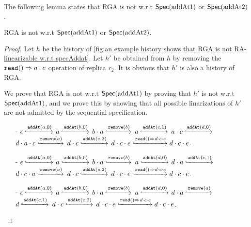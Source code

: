 The following lemma states that RGA is not \crdtlinearizable{} w.r.t $\specAddatOne$ or $\specAddatTwo$.

\begin{lemma}
\label{lemma:The history h of fig an example history shows that RGA is not RA-linarizable w.r.t specAddat is not RA-linearizable w.r.t SpecAddatOne or SpecAddatTwo}
RGA is not \crdtlinearizable{} w.r.t $\specAddatOne$ or $\specAddatTwo$.
\end{lemma}

\begin {proof}
Let $h$ be the history of \autoref{fig:an example history shows that RGA is not RA-linearizable w.r.t specAddat}. Let $h'$ be obtained from $h$ by removing the $\alabellong[\mathtt{read}]{}{a \cdot c}{}$ operation of replica $r_2$. It is obvious that $h'$ is also a history of RGA.

We prove that RGA is not \crdtlinearizable{} w.r.t $\specAddatOne$ by proving that $h'$ is not \crdtlinearizable{} w.r.t $\specAddatOne$, and we prove this by showing that all possible linarizations of $h'$ are not admitted by the sequential specification.

\begin{itemize}
\setlength{\itemsep}{0.5pt}
\item[-] $\epsilon \specarrow{\alabelshort[\mathtt{addAt}]{a,0}}$ $a \specarrow{\alabelshort[\mathtt{addAt}]{b,0}}$ $b \cdot a \specarrow{\alabelshort[\mathtt{remove}]{b}}$ $a \specarrow{\alabelshort[\mathtt{addAt}]{c,1}}$ $a \cdot c \specarrow{\alabelshort[\mathtt{addAt}]{d,0}}$ $d \cdot a \cdot c \specarrow{\alabelshort[\mathtt{remove}]{a}}$ $d \cdot c \specarrow{\alabelshort[\mathtt{addAt}]{e,2}}$ $d \cdot c \cdot e \specarrow{\alabellong[\mathtt{read}]{}{d \cdot c \cdot e}{}} d \cdot c \cdot e$.

\item[-] $\epsilon \specarrow{\alabelshort[\mathtt{addAt}]{a,0}}$ $a \specarrow{\alabelshort[\mathtt{addAt}]{b,0}}$ $b \cdot a \specarrow{\alabelshort[\mathtt{remove}]{b}}$ $a \specarrow{\alabelshort[\mathtt{addAt}]{d,0}}$ $d \cdot a \specarrow{\alabelshort[\mathtt{addAt}]{c,1}}$ $d \cdot c \cdot a \specarrow{\alabelshort[\mathtt{remove}]{a}}$ $d \cdot c \specarrow{\alabelshort[\mathtt{addAt}]{e,2}}$ $d \cdot c \cdot e \specarrow{\alabellong[\mathtt{read}]{}{d \cdot c \cdot e}{}} d \cdot c \cdot e$.

\item[-] $\epsilon \specarrow{\alabelshort[\mathtt{addAt}]{a,0}}$ $a \specarrow{\alabelshort[\mathtt{addAt}]{b,0}}$ $b \cdot a \specarrow{\alabelshort[\mathtt{remove}]{b}}$ $a \specarrow{\alabelshort[\mathtt{addAt}]{d,0}}$ $d \cdot a \specarrow{\alabelshort[\mathtt{remove}]{a}}$ $d \specarrow{\alabelshort[\mathtt{addAt}]{c,1}}$ $d \cdot c \specarrow{\alabelshort[\mathtt{addAt}]{e,2}}$ $d \cdot c \cdot e \specarrow{\alabellong[\mathtt{read}]{}{d \cdot c \cdot e}{}} d \cdot c \cdot e$.


\end{itemize}
\end{proof}
